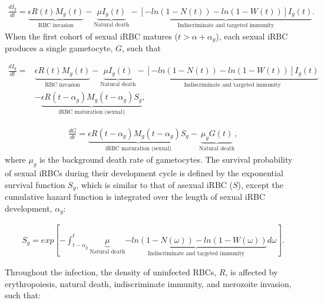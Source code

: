 \documentclass[10pt,letterpaper]{article}
\begin{document}
\begin{eqnarray}
\label{eq:scheme9}
    \frac{dI_{g}}{dt}=\underbrace{\epsilon R(t)M_{g}(t)}_{\text{RBC invasion}}-\underbrace{\mu I_{g}(t)}_{\text{Natural death}}-\underbrace{[-ln(1-N(t))-ln(1-W(t))]I_{g}(t)}_{\text{Indiscriminate and targeted immunity}}.
\end{eqnarray}
When the first cohort of sexual iRBC matures ($t>\alpha+\alpha_{g}$), each sexual iRBC produces a single gametocyte, $G$, such that

\begin{equation}
\label{eq:scheme10}
    \begin{split}
    \frac{dI_{g}}{dt}=& \underbrace{\epsilon R(t)M_{g}(t)}_{\text{RBC invasion}}-\underbrace{\mu I_{g}(t)}_{\text{Natural death}}-\underbrace{[-ln(1-N(t))-ln(1-W(t))]I_{g}(t)}_{\text{Indiscriminate and targeted immunity}}\\
    & -\underbrace{\epsilon R(t-\alpha_{g})M_{g}(t-\alpha_{g})S_{g}}_{\text{iRBC maturation (sexual)}},
    \end{split}
\end{equation}

\begin{eqnarray}
\label{eq:scheme11}
    \frac{dG}{dt}=\underbrace{\epsilon R(t-\alpha_{g})M_{g}(t-\alpha_{g})S_{g}}_{\text{iRBC maturation (sexual)}}-\underbrace{\mu_{g}G(t)}_{\text{Natural death}},
\end{eqnarray}
where $\mu_{g}$ is the background death rate of gametocytes. The survival probability of sexual iRBCs during their development cycle is defined by the exponential survival function $S_{g}$, which is similar to that of asexual iRBC ($S$), except the cumulative hazard function is integrated over the length of sexual iRBC development, $\alpha_{g}$:

\begin{eqnarray}
\label{eq::co_sg}
    S_{g}=exp[-\int_{t-\alpha_{g}}^{t} \underbrace{\mu}_{\text{Natural death}} \underbrace{-ln(1-N(\omega))-ln(1-W(\omega))}_{\text{Indiscriminate and targeted immunity}}d\omega].
\end{eqnarray}

Throughout the infection, the density of uninfected RBCs, $R$, is affected by erythropoiesis, natural death, indiscriminate immunity, and merozoite invasion,  such that:
\end{document}
